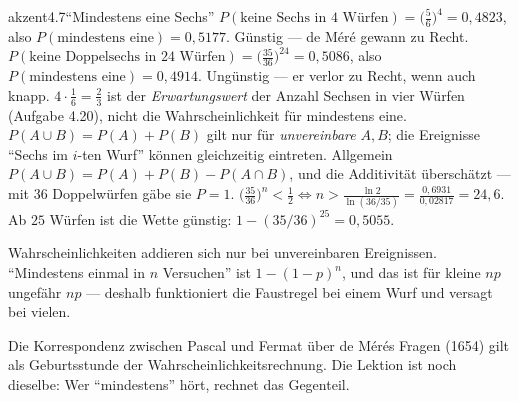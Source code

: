 \begin{loesungkarte}{akzent}{4.7}{\enquote{Mindestens eine Sechs}}
$P(\text{keine Sechs in 4 Würfen}) = \bigl(\frac56\bigr)^{4} = 0{,}4823$, also $P(\text{mindestens eine}) = 0{,}5177$. Günstig --- de Méré gewann zu Recht.
$P(\text{keine Doppelsechs in 24 Würfen}) = \bigl(\frac{35}{36}\bigr)^{24} = 0{,}5086$, also $P(\text{mindestens eine}) = 0{,}4914$. Ungünstig --- er verlor zu Recht, wenn auch knapp.
$4\cdot\frac16 = \frac23$ ist der \emph{Erwartungswert} der Anzahl Sechsen in vier Würfen (Aufgabe 4.20), nicht die Wahrscheinlichkeit für mindestens eine. $P(A\cup B) = P(A) + P(B)$ gilt nur für \emph{unvereinbare} $A, B$; die Ereignisse \enquote{Sechs im $i$-ten Wurf} können gleichzeitig eintreten. Allgemein $P(A\cup B) = P(A) + P(B) - P(A\cap B)$, und die Additivität überschätzt --- mit $36$ Doppelwürfen gäbe sie $P = 1$.
$\bigl(\frac{35}{36}\bigr)^{n} < \frac12\iff n > \frac{\ln2}{\ln(36/35)} = \frac{0{,}6931}{0{,}02817} = 24{,}6$. Ab $25$ Würfen ist die Wette günstig: $1 - (35/36)^{25} = 0{,}5055$.
\begin{fehler}\kastentext
Wahrscheinlichkeiten addieren sich nur bei unvereinbaren Ereignissen. \enquote{Mindestens einmal in $n$ Versuchen} ist $1 - (1 - p)^{n}$, und das ist für kleine $np$ ungefähr $np$ --- deshalb funktioniert die Faustregel bei einem Wurf und versagt bei vielen.
\end{fehler}
\begin{mitnehmen}\kastentext
Die Korrespondenz zwischen Pascal und Fermat über de Mérés Fragen (1654) gilt als Geburtsstunde der Wahrscheinlichkeitsrechnung. Die Lektion ist noch dieselbe: Wer \enquote{mindestens} hört, rechnet das Gegenteil.
\end{mitnehmen}
\end{loesungkarte}

